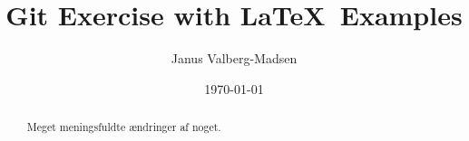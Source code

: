 \documentclass[10pt,a4paper]{article}
\title{Git Exercise with \LaTeX\ Examples}
\author{Janus Valberg-Madsen}
\date{\today}
\begin{document}
\maketitle

\begin{abstract}
  
  
Meget meningsfuldte ændringer af noget.

\end{abstract}

\tableofcontents



\end{document}
